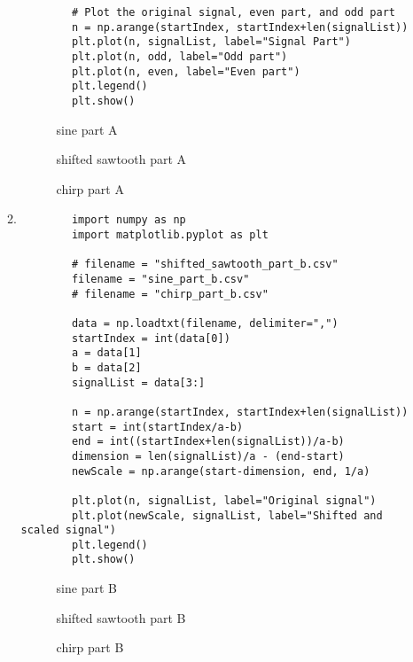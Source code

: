 \documentclass[10pt,a4paper, margin=1in]{article}
\begin{document}
\begin{enumerate}
\begin{enumerate}
\begin{verbatim}
        # Plot the original signal, even part, and odd part
        n = np.arange(startIndex, startIndex+len(signalList))
        plt.plot(n, signalList, label="Signal Part")
        plt.plot(n, odd, label="Odd part")
        plt.plot(n, even, label="Even part")
        plt.legend()
        plt.show()
    \end{verbatim}

        \begin{figure}[htp] 
            \caption{sine part A}
            \end{figure}
            \begin{figure}[htp] 
            \caption{shifted sawtooth part A}
            \end{figure} 
            \begin{figure}[htp] 
            \caption{chirp part A}
        \end{figure}

\newpage
    \item %
    \begin{verbatim}
        import numpy as np
        import matplotlib.pyplot as plt
        
        # filename = "shifted_sawtooth_part_b.csv"
        filename = "sine_part_b.csv"
        # filename = "chirp_part_b.csv"
        
        data = np.loadtxt(filename, delimiter=",")
        startIndex = int(data[0])
        a = data[1]
        b = data[2]
        signalList = data[3:]
        
        n = np.arange(startIndex, startIndex+len(signalList))
        start = int(startIndex/a-b)
        end = int((startIndex+len(signalList))/a-b)
        dimension = len(signalList)/a - (end-start)
        newScale = np.arange(start-dimension, end, 1/a)
        
        plt.plot(n, signalList, label="Original signal")
        plt.plot(newScale, signalList, label="Shifted and scaled signal")
        plt.legend()
        plt.show()
    \end{verbatim}
    
    \begin{figure}[htp] 
        \caption{sine part B}
        \end{figure}
        \begin{figure}[htp] 
        \caption{shifted sawtooth part B}
        \end{figure} 
        \begin{figure}[htp] 
        \caption{chirp part B}
    \end{figure}
    \end{enumerate}    
\end{enumerate}
\end{document}

